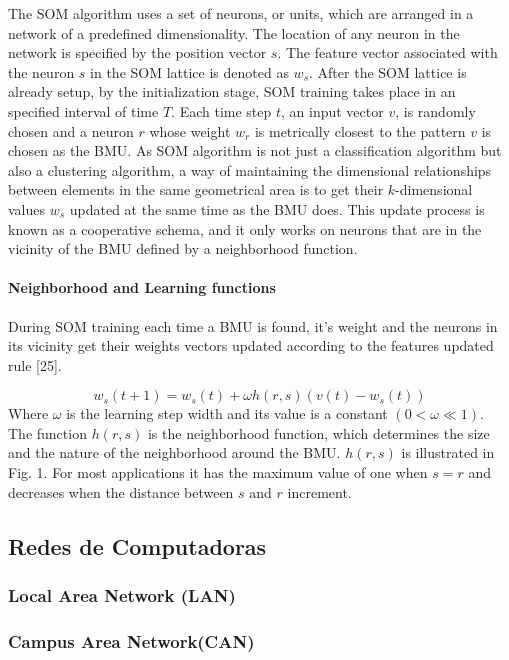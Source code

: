 \documentclass{article}
\begin{document}
The SOM algorithm uses a set of neurons, or units, which are arranged in a network of a predefined dimensionality. The location of any neuron in the network is specified by the position vector $s$. The feature vector associated with the neuron $s$ in the SOM lattice is denoted as $w_s$.
After the SOM lattice is already setup, by the initialization stage, SOM training takes place in an specified interval of time $T$. Each time step $t$, an input vector $v$, is randomly chosen and a neuron $r$ whose weight $w_r$ is metrically closest to the pattern $v$ is chosen as the BMU. As SOM algorithm is not just a classification algorithm but also a clustering algorithm, a way of maintaining the dimensional relationships between elements in the same geometrical area is to get their $k$-dimensional values $w_s$ updated at the same time as the BMU does. This update process is known as a cooperative schema, and it only works on neurons that are in the vicinity of the BMU defined by a neighborhood function.

\paragraph{Neighborhood and Learning functions} %
During SOM training each time a BMU is found, it's weight and the neurons in its vicinity get their weights vectors updated according to the features updated rule [25].

\begin{equation}
w_s(t + 1) = w_s(t) + \omega h(r,s)(v(t) -w_s(t))
\end{equation}
Where $\omega$ is the learning step width and its value is a constant $(0 < \omega \ll 1)$. The function $h(r,s)$ is the neighborhood function, which determines the size and the nature of the neighborhood around the BMU. $h(r,s)$ is illustrated in Fig. 1. For most applications it has the maximum value of one when $s = r$ and decreases when the distance between $s$ and $r$ increment.

\subsection{Redes de Computadoras} %


\subsubsection{Local Area Network (LAN)} %


\subsubsection{Campus Area Network(CAN)} %
\end{document}
